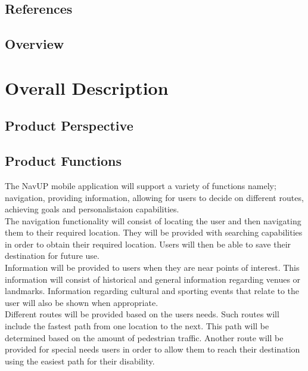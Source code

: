 \documentclass[11pt,a4paper]{article}
\begin{document}
	\subsection{References}


	\subsection{Overview}
		

\newpage
\section{Overall Description}
	\subsection{Product Perspective}
	\subsection{Product Functions}
	The NavUP mobile application will support a variety of functions namely; navigation, providing information, allowing for users to decide on different routes, achieving goals and personalistaion capabilities.
	\\

	The navigation functionality will consist of locating the user and then navigating them to their required location. They will be provided with searching capabilities in order to obtain their required location. Users will then be able to save their destination for future use.
	\\

	Information will be provided to users when they are near points of interest. This information will consist of historical and general information regarding venues or landmarks. Information regarding cultural and sporting events that relate to the user will also be shown when appropriate.
	\\

	Different routes will be provided based on the users needs. Such routes will include the fastest path from one location to the next. This path will be determined based on the amount of pedestrian traffic. Another route will be provided for special needs users in order to allow them to reach their destination using the easiest path for their disability.
	\\
\end{document}
